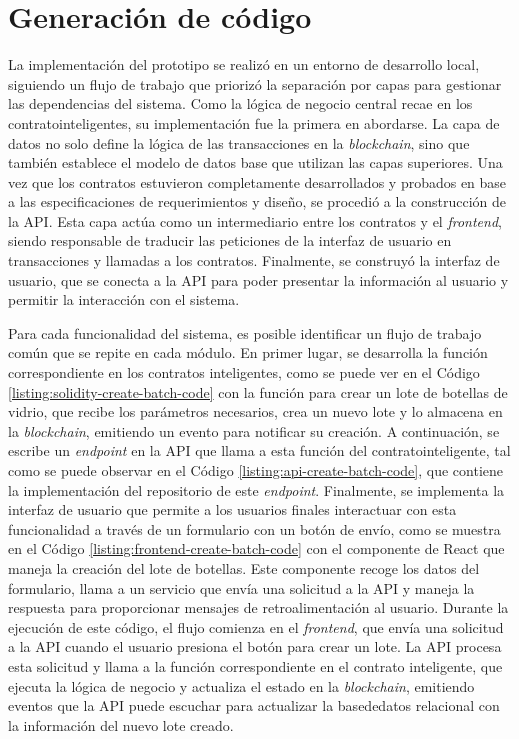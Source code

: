 \section{Generación de código}
\label{sec:code-generation}

La implementación del prototipo se realizó en un entorno de desarrollo local, siguiendo un flujo de trabajo que priorizó la separación por capas para gestionar las dependencias del sistema. Como la lógica de negocio central recae en los \glspl{contratointeligente}, su implementación fue la primera en abordarse. La capa de datos no solo define la lógica de las transacciones en la \textit{blockchain}, sino que también establece el modelo de datos base que utilizan las capas superiores. Una vez que los contratos estuvieron completamente desarrollados y probados en base a las especificaciones de requerimientos y diseño, se procedió a la construcción de la API. Esta capa actúa como un intermediario entre los contratos y el \textit{\gls{frontend}}, siendo responsable de traducir las peticiones de la interfaz de usuario en transacciones y llamadas a los contratos. Finalmente, se construyó la interfaz de usuario, que se conecta a la API para poder presentar la información al usuario y permitir la interacción con el sistema.

Para cada funcionalidad del sistema, es posible identificar un flujo de trabajo común que se repite en cada módulo. En primer lugar, se desarrolla la función correspondiente en los contratos inteligentes, como se puede ver en el Código \ref{listing:solidity-create-batch-code} con la función para crear un lote de botellas de vidrio, que recibe los parámetros necesarios, crea un nuevo lote y lo almacena en la \textit{blockchain}, emitiendo un evento para notificar su creación. A continuación, se escribe un \textit{\gls{endpoint}} en la API que llama a esta función del \gls{contratointeligente}, tal como se puede observar en el Código \ref{listing:api-create-batch-code}, que contiene la implementación del repositorio de este \textit{endpoint}. Finalmente, se implementa la interfaz de usuario que permite a los usuarios finales interactuar con esta funcionalidad a través de un formulario con un botón de envío, como se muestra en el Código \ref{listing:frontend-create-batch-code} con el componente de React que maneja la creación del lote de botellas. Este componente recoge los datos del formulario, llama a un servicio que envía una solicitud a la API y maneja la respuesta para proporcionar mensajes de retroalimentación al usuario. Durante la ejecución de este código, el flujo comienza en el \textit{frontend}, que envía una solicitud a la API cuando el usuario presiona el botón para crear un lote. La API procesa esta solicitud y llama a la función correspondiente en el contrato inteligente, que ejecuta la lógica de negocio y actualiza el estado en la \textit{blockchain}, emitiendo eventos que la API puede escuchar para actualizar la \gls{basededatos} relacional con la información del nuevo lote creado. 


